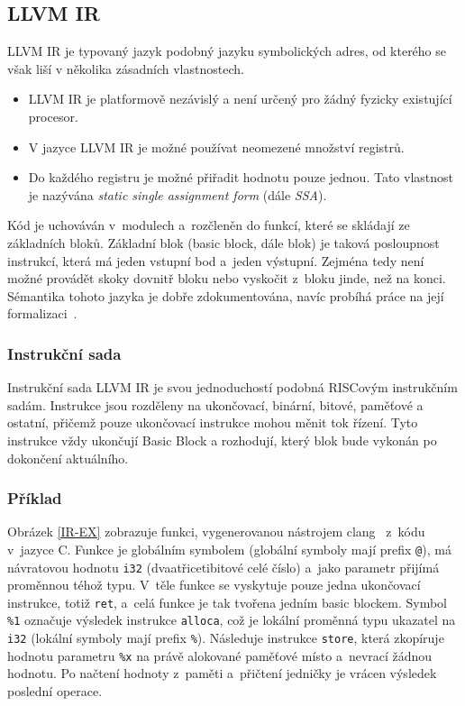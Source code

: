 \documentclass{fithesis2}
\begin{document}
\subsection{LLVM IR}
LLVM IR je typovaný jazyk podobný jazyku symbolických adres, od kterého se však liší v několika zásadních vlastnostech.
\begin{itemize}
\item LLVM IR je platformově nezávislý a není určený pro žádný fyzicky existující procesor.
\item V jazyce LLVM IR je možné používat neomezené množství registrů.
\item Do každého registru je možné přiřadit hodnotu pouze jednou. Tato vlastnost je nazývána \textit{static single assignment form} (dále \textit{SSA}).
\end{itemize}
Kód je uchováván v~modulech a~rozčleněn do funkcí, které se skládají ze základních bloků. Základní blok (basic block, dále blok) je taková posloupnost instrukcí, která má jeden vstupní bod a~jeden výstupní. Zejména tedy není možné provádět skoky dovnitř bloku nebo vyskočit z~bloku jinde, než na konci. Sémantika tohoto jazyka je dobře zdokumentována, navíc probíhá práce na její formalizaci~\cite{LLVMForm}.

\subsubsection{Instrukční sada}
Instrukční sada LLVM IR je svou jednoduchostí podobná RISCovým instrukčním sadám. Instrukce jsou rozděleny na ukončovací, binární, bitové, paměťové a ostatní, přičemž pouze ukončovací instrukce mohou měnit tok řízení. Tyto instrukce vždy ukončují Basic Block a rozhodují, který blok bude vykonán po dokončení aktuálního.

\subsubsection{Příklad}
Obrázek \ref{IR-EX} zobrazuje funkci, vygenerovanou nástrojem clang~\cite{clang} z~kódu v~jazyce C. Funkce je globálním symbolem (globální symboly mají prefix \texttt{@}), má návratovou hodnotu \texttt{i32} (dvaatřicetibitové celé číslo) a~jako parametr přijímá proměnnou téhož typu. V~těle funkce se vyskytuje pouze jedna ukončovací instrukce, totiž \texttt{ret}, a~celá funkce je tak tvořena jedním basic blockem. Symbol \texttt{\%1} označuje výsledek instrukce \texttt{alloca}, což je lokální proměnná typu ukazatel na \texttt{i32} (lokální symboly mají prefix \texttt{\%}). Následuje instrukce \texttt{store}, která zkopíruje hodnotu parametru \texttt{\%x} na právě alokované paměťové místo a~nevrací žádnou hodnotu. Po načtení hodnoty z~paměti a~přičtení jedničky je vrácen výsledek poslední operace.
\end{document}
